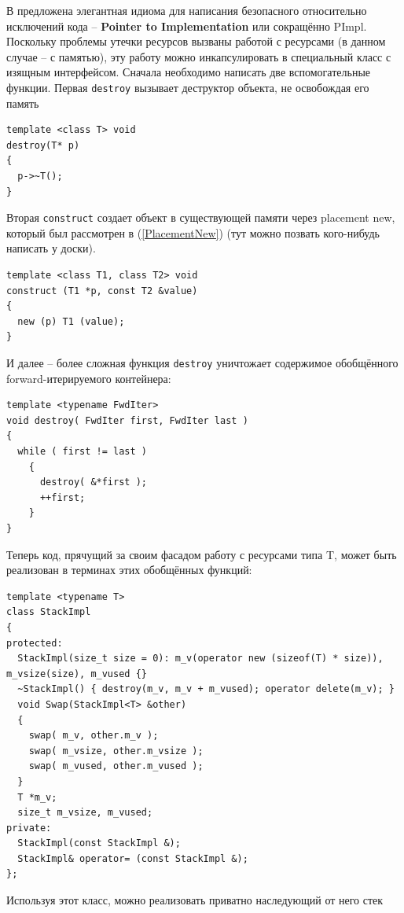 \documentclass[a4paper,12pt,oneside]{article}
\begin{document}
В \cite{exceptionalcpp} предложена элегантная идиома для написания безопасного относительно исключений кода -- \textbf{Pointer to Implementation} или сокращённо PImpl. Поскольку проблемы утечки ресурсов вызваны работой с ресурсами (в данном случае -- с памятью), эту работу можно инкапсулировать в специальный класс с изящным интерфейсом. Сначала необходимо написать две вспомогательные функции. Первая \lstinline!destroy! вызывает деструктор объекта, не освобождая его память

\begin{lstlisting}
template <class T> void
destroy(T* p)
{
  p->~T();
}
\end{lstlisting}

Вторая \lstinline!construct! создает объект в существующей памяти через placement new, который был рассмотрен в (\ref{PlacementNew}) (тут можно позвать кого-нибудь написать у доски).

\begin{lstlisting}
template <class T1, class T2> void
construct (T1 *p, const T2 &value)
{
  new (p) T1 (value);
}
\end{lstlisting}

И далее -- более сложная функция \lstinline!destroy! уничтожает содержимое обобщённого forward-итерируемого контейнера:

\begin{lstlisting}
template <typename FwdIter>
void destroy( FwdIter first, FwdIter last )
{
  while ( first != last )
    {
      destroy( &*first ); 
      ++first;
    }
}
\end{lstlisting}

Теперь код, прячущий за своим фасадом работу с ресурсами типа T, может быть реализован в терминах этих обобщённых функций:

\begin{lstlisting}
template <typename T>
class StackImpl
{
protected:
  StackImpl(size_t size = 0): m_v(operator new (sizeof(T) * size)), m_vsize(size), m_vused {}
  ~StackImpl() { destroy(m_v, m_v + m_vused); operator delete(m_v); }
  void Swap(StackImpl<T> &other) 
  {
    swap( m_v, other.m_v );
    swap( m_vsize, other.m_vsize );
    swap( m_vused, other.m_vused );
  }
  T *m_v;
  size_t m_vsize, m_vused;
private:
  StackImpl(const StackImpl &);
  StackImpl& operator= (const StackImpl &);
};
\end{lstlisting}

Используя этот класс, можно реализовать приватно наследующий от него стек
\end{document}

